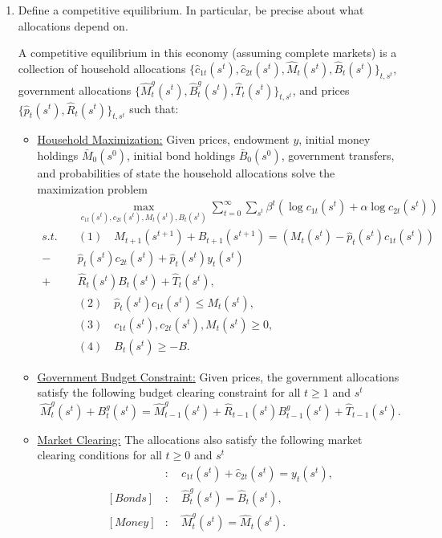\documentclass[11pt,english]{article}
\begin{document}
\begin{enumerate}[label = (\alph*)]
    \item Define a competitive equilibrium. In particular, be precise about what allocations depend on.
\begin{solution}
A competitive equilibrium in this economy (assuming complete markets) is a collection of household allocations $\{\hat{c}_{1t}(s^t), \hat{c}_{2t}(s^t), \hat{M}_t(s^t), \hat{B}_t(s^t)\}_{t,s^t}$, government allocations $\{\hat{M}_t^g(s^t), \hat{B}_t^g(s^t), \hat{T}_t(s^t)\}_{t, s^t}$, and prices $\{\hat{p}_t(s^t), \hat{R}_t(s^t)\}_{t, s^t}$ such that:
\begin{itemize}
\item \underline{Household Maximization:} Given prices, endowment $y$, initial money holdings $\bar{M}_0(s^0)$, initial bond holdings $\bar{B}_0(s^0)$, government transfers, and probabilities of state the household allocations solve the maximization problem
\begin{align*}
&\max_{c_{1t}(s^t), c_{2t}(s^t), M_t(s^t), B_t(s^t)} \sum_{t=0}^\infty\sum_{s^t}\beta^t(\log c_{1t}(s^t) + \alpha \log c_{2t}(s^t))\\
s.t. \quad &(1)\quad M_{t+1}(s^{t+1}) + B_{t+1}(s^{t+1}) = (M_{t}(s^{t}) - \hat{p}_{t}(s^{t})c_{1t}(s^{t})) \\- &\hat{p}_{t}(s^{t})c_{2t}(s^{t}) + \hat{p}_{t}(s^{t})y_{t}(s^{t})\\ + &\hat{R}_{t}(s^{t})B_{t}(s^{t}) + \hat{T}_{t}(s^{t}) ,\\
&(2)\quad \hat{p}_t(s^t) c_{1t}(s^t) \leq M_t(s^t),\\
&(3)\quad c_{1t}(s^t), c_{2t}(s^t), M_t(s^t) \geq 0,\\
&(4)\quad B_t(s^t) \geq -B.
\end{align*}
\item \underline{Government Budget Constraint:} Given prices, the government allocations satisfy the following budget clearing constraint for all $t\geq 1$ and $s^t$
$$\hat{M}_{t}^g(s^t) + B_t^g(s^t) = \hat{M}^g_{t-1}(s^t) + \hat{R}_{t-1}(s^t)B_{t-1}^g(s^t) + \hat{T}_{t-1}(s^t).$$
\item \underline{Market Clearing:} The allocations also satisfy the following market clearing conditions for all $t\geq 0$ and $s^t$
\begin{align*}
[Goods]&: \quad \hat{c}_{1t}(s^t) + \hat{c}_{2t}(s^t) = y_t(s^t),\\
[Bonds]&: \quad \hat{B}_t^g (s^t)= \hat{B}_t(s^t),\\
[Money]&:\quad \hat{M}_t^g(s^t) = \hat{M}_t(s^t).

\end{align*}
\end{itemize}
\end{solution}
\end{enumerate}
\end{document}
